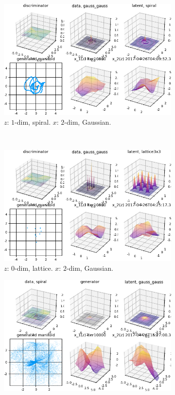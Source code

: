 \begin{figure}[ht]
\centering
    \begin{subfigure}[t]{0.45\textwidth}
        \includegraphics[width=\linewidth]{"fig/spiral_gaussgauss_000100"}
        \caption{$z$: $1$-dim, spiral.
            $x$: $2$-dim, Gaussian.}
    \end{subfigure}
    ~
    \begin{subfigure}[t]{0.45\textwidth}
        \includegraphics[width=\linewidth]{"fig/lattice3x3_gaussgauss_000100"}
        \caption{$z$: $0$-dim, lattice.
            $x$: $2$-dim, Gaussian.}
    \end{subfigure}
    \vskip 0.4cm
    \begin{subfigure}[t]{0.45\textwidth}
        \includegraphics[width=\linewidth]{"fig/gaussgauss_spiral_000100"}

\end{subfigure}
\end{figure}
